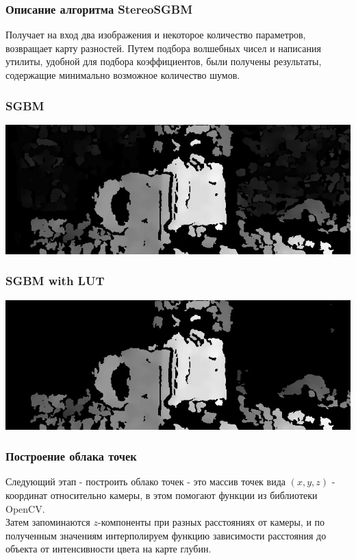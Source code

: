 \documentclass{beamer}
\begin{document}
		\begin{frame}
			\frametitle{Описание алгоритма StereoSGBM}
			
			Получает на вход два изображения и некоторое количество параметров,
			возвращает карту разностей. Путем подбора волшебных чисел и написания
			утилиты, удобной для подбора коэффициентов, были получены результаты,
			содержащие минимально возможное количество шумов.
		\end{frame}
		
		\begin{frame}
		    \frametitle{SGBM}
		   
		    \begin{center}
				\includegraphics[scale=0.7]{images/disp}
			\end{center}
		\end{frame}
		
		\begin{frame}
		    \frametitle{SGBM with LUT}
		   
		    \begin{center}
				\includegraphics[scale=0.7]{images/dispLUT}
			\end{center}
		\end{frame}
		
		\begin{frame}
			\frametitle{Построение облака точек}
			
			Следующий этап - построить облако точек - это массив
			точек вида $(x, y, z)$ - координат относительно камеры, в
			этом помогают функции из библиотеки OpenCV.\\
			Затем запоминаются $z$-компоненты при разных расстояниях от камеры,
			и по полученным значениям интерполируем функцию зависимости
			расстояния до объекта от интенсивности цвета на карте глубин.
		\end{frame}
		
\end{document}
